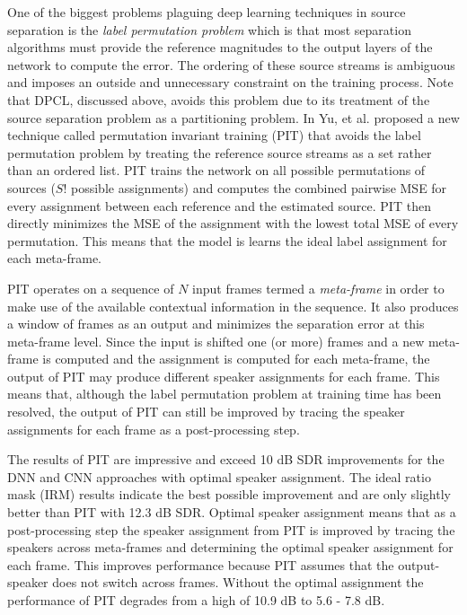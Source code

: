 \documentclass[journal, a4paper]{IEEEtran}
\begin{document}
One of the biggest problems plaguing deep learning techniques in source separation is the \textit{label permutation problem} which is that most separation algorithms must provide the reference magnitudes to the output layers of the network to compute the error. The ordering of these source streams is ambiguous and imposes an outside and unnecessary constraint on the training process. Note that DPCL, discussed above, avoids this problem due to its treatment of the source separation problem as a partitioning problem. In \cite{DBLP:journals/corr/YuKTJ16} Yu, et al. proposed a new technique called permutation invariant training (PIT) that avoids the label permutation problem by treating the reference source streams as a set rather than an ordered list. PIT trains the network on all possible permutations of sources ($S!$ possible assignments) and computes the combined pairwise MSE for every assignment between each reference and the estimated source. PIT then directly minimizes the MSE of the assignment with the lowest total MSE of every permutation. This means that the model is learns the ideal label assignment for each meta-frame.

PIT operates on a sequence of $N$ input frames termed a \textit{meta-frame} in order to make use of the available contextual information in the sequence. It also produces a window of frames as an output and minimizes the separation error at this meta-frame level. Since the input is shifted one (or more) frames and a new meta-frame is computed and the assignment is computed for each meta-frame, the output of PIT may produce different speaker assignments for each frame. This means that, although the label permutation problem at training time has been resolved, the output of PIT can still be improved by tracing the speaker assignments for each frame as a post-processing step.

The results of PIT are impressive and exceed 10 dB SDR improvements for the DNN and CNN approaches with optimal speaker assignment. The ideal ratio mask (IRM) results indicate the best possible improvement and are only slightly better than PIT with 12.3 dB SDR. Optimal speaker assignment means that as a post-processing step the speaker assignment from PIT is improved by tracing the speakers across meta-frames and determining the optimal speaker assignment for each frame. This improves performance because PIT assumes that the output-speaker does not switch across frames. Without the optimal assignment the performance of PIT degrades from a high of 10.9 dB to 5.6 - 7.8 dB.
\end{document}

